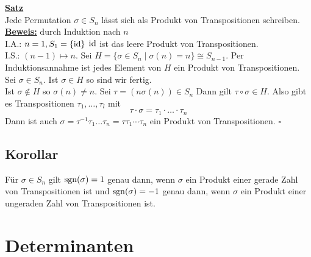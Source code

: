 { \large \textbf{\underline{Satz}} }
\vspace{10pt} \\
Jede Permutation $\sigma \in S_n$ lässt sich als Produkt von Transpositionen schreiben.
\vspace{10pt} \\
\underline{\textbf{Beweis:}} durch Induktion nach $n$
\vspace{10pt} \\
I.A.: $n=1 , S_1= \{ \operatorname{id} \}$ $\operatorname{id}$ ist das leere Produkt von Transpositionen. 
\vspace{10pt} \\
I.S.: $(n-1) \mapsto n$. Sei $H= \{ \sigma \in S_n \mid \sigma(n)=n \} \cong S_{n-1}$. Per Induktionsannahme ist jedes Element von $H$ ein Produkt von Transpositionen. \\
Sei $\sigma \in S_n$. Ist $\sigma \in H$ so sind wir fertig. \\
Ist $\sigma \not\in H$ so $\sigma(n) \not= n$. Sei $\tau = (n \sigma(n)) \in S_n$ Dann gilt $\tau \circ \sigma \in H$. Also gibt es Transpositionen 
$\tau_1 , \ldots , \tau_l$ mit 
\[
	\tau \cdot  \sigma = \tau_1 \cdot \ldots \cdot \tau_n
\]
Dann ist auch $\sigma = \tau ^{-1} \tau_1 \ldots  \tau_n = \tau \tau_1 \cdots \tau_n$ ein Produkt von Transpositionen. \hfill \( \square \)

\subsection{Korollar} %
\label{sub:korollar}
Für $\sigma\in S_n$ gilt $\operatorname{sgn}(\sigma)=1$ genau dann, wenn $\sigma$ ein Produkt einer gerade Zahl von Transpositionen ist und $\operatorname{sgn}(\sigma)= -1$ genau dann,
wenn $\sigma$ ein Produkt einer ungeraden Zahl von Transpositionen ist.

\section{Determinanten} %
\label{sec:determinanten}

